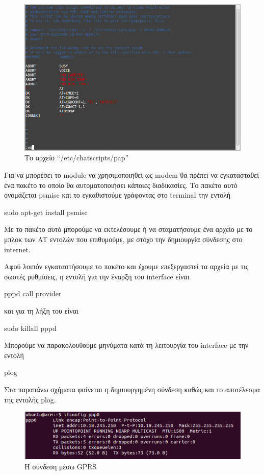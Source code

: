 \documentclass[12pt, a4paper, oneside]{report}
\begin{document}
\begin{figure}[!h]
\centering
\includegraphics[scale=0.55]{eikona_32}
\caption{Το αρχείο ``\slash etc\slash chatscripts\slash pap''}\label{eik32}
\end{figure}

Για να μπορέσει το module να χρησιμοποιηθεί ως modem θα πρέπει να εγκατασταθεί ένα πακέτο το οποίο θα αυτοματοποιήσει κάποιες διαδικασίες. Το πακέτο αυτό ονομάζεται psmisc και το εγκαθιστούμε γράφοντας στο terminal την εντολή 
\begin{code}
sudo apt-get install psmisc
\end{code}
Με το πακέτο αυτό μπορούμε να εκτελέσουμε ή να σταματήσουμε ένα αρχείο με το μπλοκ των AT εντολών που επιθυμούμε, με στόχο την δημιουργία σύνδεσης στο internet.

Αφού λοιπόν εγκαταστήσουμε το πακέτο και έχουμε επεξεργαστεί τα αρχεία με τις σωστές ρυθμίσεις, η εντολή για την έναρξη του interface είναι 
\begin{code}
pppd call provider
\end{code} 
και για τη λήξη του είναι 
\begin{code}
sudo killall pppd
\end{code}
Μπορούμε να παρακολουθούμε μηνύματα κατά τη λειτουργία του interface με την εντολή 
\begin{code}
plog
\end{code}

Στα παραπάνω σχήματα φαίνεται η δημιουργημένη σύνδεση καθώς και το αποτέλεσμα της εντολής plog.

\begin{figure}
\centering
\includegraphics[scale=0.8]{eikona_33}
\caption{Η σύνδεση μέσω GPRS}
\end{figure}
\end{document}
